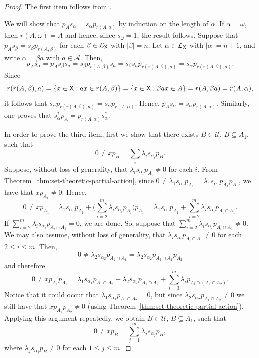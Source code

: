 \documentclass[a4paper,12pt]{amsart}
\theoremstyle{definition}
\theoremstyle{remark}
\numberwithin{equation}{section}
\newcommand{\osf}{{\normalfont \textsf{X}}}
\newcommand{\lang}{\CL_{\osf}}
\newcommand{\alf}{\mathscr{A}}
\newcommand{\CL}{\mathcal{L}}
\newcommand{\TCB}{\mathcal{U}}
\begin{document}
\begin{proof} The first item follows from \cite[Proposition 3.6 (i)]{BGGV}. 

We will show that $p_A s_\alpha=s_\alpha p_{r(A,\alpha)}$ by induction on the length of $\alpha$. If $\alpha=\omega$, then $r(A,\omega)=A$ and hence, since $s_\omega=1$, the result follows.
Suppose that $p_As_\beta=s_\beta p_{r(A,\beta)}$ for each $\beta \in \lang$ with $|\beta|=n$. Let $\alpha\in \lang$ with $|\alpha|=n+1$, and write $\alpha=\beta a$ with $a\in \alf$. 
Then, $$p_As_\alpha=p_A s_\beta s_a=s_\beta p_{r(A,\beta)}s_a=s_\beta s_a p_{r(r(A,\beta),a)}=s_\alpha p_{r(r(A,\beta),a)}.$$  
Since $$r(r(A,\beta),a)=\{x\in \osf: ax\in r(A,\beta)\}=\{x\in \osf: \beta ax\in A\}=r(A,\beta a)=r(A,\alpha),$$
it follows that $s_\alpha p_{r(r(A,\beta),a)}=s_\alpha p_{r(A,\alpha)}$. Hence, $p_As_\alpha=s_\alpha p_{r(A,\alpha)}$. Similarly, one proves that $s_\alpha^*p_A=p_{r(A,\alpha)}s_\alpha^*$.

In order to prove the third item, first we show that there exists $B \in \TCB$, $B\subseteq A_1$, such that $$0\neq xp_B=\sum\limits_i \lambda_i s_{\alpha_i}p_B.$$ Suppose, without loss of generality, that $\lambda_i s_{\alpha_i} p_{A_i}\neq 0$
 for each $i$. From Theorem~\ref{thm:set-theoretic-partial-action}, since $0\neq \lambda_1 s_{\alpha_1} p_{A_1}=\lambda_1 s_{\alpha_1} p_{A_1}p_{A_1}$, we have that $xp_{A_1}\neq 0$. Hence, $$0\neq xp_{A_1}=\lambda_1 s_{\alpha_1}p_{A_1}+\big(\sum \limits_{i=2}^m\lambda_i s_{\alpha_i}p_{A_i}\big)p_{A_1}=\lambda_1 s_{\alpha_1}p_{A_1}+\sum \limits_{i=2}^m\lambda_i s_{\alpha_i}p_{A_i\cap A_1}.$$
  If $\sum \limits_{i=2}^m\lambda_i s_{\alpha_i}p_{A_i\cap A_1}=0$, we are done. So, suppose that $\sum \limits_{i=2}^m\lambda_i s_{\alpha_i}p_{A_i\cap A_1}\neq 0$. We may also assume, without loss of generality, that $\lambda_i s_{\alpha_i}p_{A_i\cap A_1}\neq 0$ for each $2\leq i \leq m$. Then, 
 $$0\neq \lambda_2s_{\alpha_2}p_{A_2\cap A_1}=\lambda_2s_{\alpha_2}p_{A_2\cap A_1}p_{A_2}$$ and therefore
 $$0\neq xp_{A_1} p_{A_2}=\lambda_1 s_{{\alpha}_1}p_{A_1\cap A_2}+ \lambda_2 s_{\alpha_2} p_{A_1\cap A_2}+\sum\limits_{i=3}^m\lambda_i p_{A_i\cap (A_1\cap A_2)}.$$ Notice that it could occur that $\lambda_1 s_{\alpha_1}p_{A_1\cap A_2}=0$, but since $\lambda_2 s_{\alpha_2}p_{A_1\cap A_2}\neq 0 $ we still have that $xp_{A_1}p_{A_2}\neq 0$ (using Theorem~\ref{thm:set-theoretic-partial-action}). Applying this argument repeatedly,  we obtain $B\in \TCB$, $B\subseteq A_1$, such that $$0 \neq xp_B = \sum\limits_{j=1}^m \lambda_j s_{\alpha_j}p_B,$$ where $\lambda_j s_{\alpha_j} p_B \neq 0$ for each $1\leq j\leq m$. 
 

\end{proof}
\end{document}
